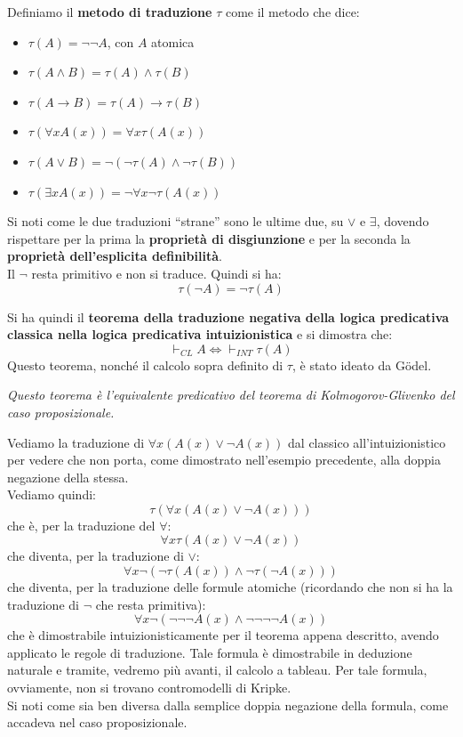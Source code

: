 \documentclass[a4paper,12pt, oneside]{book}
\begin{document}
\begin{definizione}
  Definiamo il \textbf{metodo di traduzione} $\tau$ come il metodo che dice:
  \begin{itemize}
    \item $\tau(A)=\neg\neg A$, con $A$ atomica
    \item $\tau(A\land B)=\tau(A)\land \tau (B)$
    \item $\tau(A\to B)=\tau(A)\to \tau (B)$
    \item $\tau(\forall x A(x))=\forall x\tau(A(x))$
    \item $\tau(A\lor B)=\neg(\neg \tau(A)\land \neg\tau(B))$
    \item $\tau(\exists x A(x))=\neg\forall x\neg\tau(A(x))$
  \end{itemize}
  Si noti come le due traduzioni ``strane'' sono le ultime due, su $\lor$ e
  $\exists$, dovendo rispettare per la prima la \textbf{proprietà di
    disgiunzione} e per la seconda la \textbf{proprietà dell'esplicita
    definibilità}. \\
  Il $\neg$ resta primitivo e non si traduce. Quindi si ha:
  \[\tau(\neg A)=\neg\tau(A)\]
\end{definizione}
\begin{teorema}
  Si ha quindi il \textbf{teorema della traduzione negativa della logica
    predicativa classica nella logica predicativa intuizionistica} e
  si dimostra che:
  \[\vdash_{CL}A\iff \vdash_{INT}\tau(A)\]
  Questo teorema, nonché il calcolo sopra definito di $\tau$, è stato ideato da
  G\"{o}del. 
\end{teorema}
\textit{Questo teorema è l'equivalente predicativo del teorema di
  Kolmogorov-Glivenko del caso proposizionale.}
\begin{esempio}
  Vediamo la traduzione di $\forall x(A(x)\lor\neg A(x))$ dal classico
  all'intuizionistico per vedere che non porta, come dimostrato nell'esempio
  precedente, alla doppia negazione della stessa.\\
  Vediamo quindi:
  \[\tau(\forall x(A(x)\lor\neg A(x)))\]
  che è, per la traduzione del $\forall$:
  \[\forall x\tau(A(x)\lor \neg A(x))\]
  che diventa, per la traduzione di $\lor$:
  \[\forall x\neg(\neg \tau(A(x))\land \neg \tau(\neg A(x)))\]
  che diventa, per la traduzione delle formule atomiche (ricordando che non si
  ha la traduzione di $\neg$ che resta primitiva): 
  \[\forall x\neg(\neg\neg \neg A(x)\land\neg\neg\neg\neg A(x))\]
  che è dimostrabile intuizionisticamente per il teorema appena descritto,
  avendo applicato le regole di traduzione. Tale formula è dimostrabile in
  deduzione naturale e tramite, vedremo più avanti, il calcolo a tableau. Per
  tale formula, ovviamente, non si trovano contromodelli di Kripke.\\
  Si noti come sia ben diversa dalla semplice doppia negazione della formula,
  come accadeva nel caso proposizionale.
\end{esempio}
\end{document}
